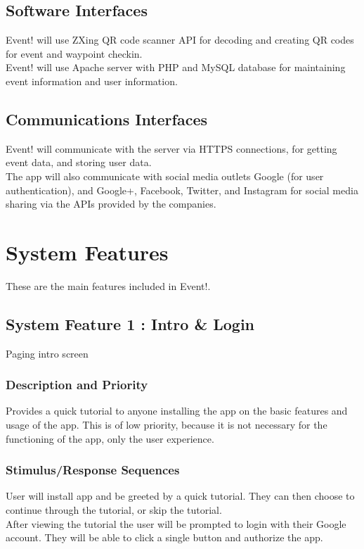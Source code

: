 \documentclass{scrreprt}
\begin{document}
\section{Software Interfaces}
Event! will use ZXing QR code scanner API for decoding and creating QR codes for 
event and waypoint checkin. \\
Event! will use Apache server with PHP and MySQL database for maintaining event 
information and user information.

\section{Communications Interfaces}
Event! will communicate with the server via HTTPS connections, for getting event 
data, and storing user data. \\
The app will also communicate with social media outlets Google (for user authentication), 
and Google+, Facebook, Twitter, and Instagram for social media sharing via the 
APIs provided by the companies.

\chapter{System Features}
These are the main features included in Event!.

\section{System Feature 1 : Intro \& Login}
Paging intro screen

\subsection{Description and Priority}
Provides a quick tutorial to anyone installing the app on the basic features and 
usage of the app. This is of low priority, because it is not necessary for the functioning 
of the app, only the user experience.

\subsection{Stimulus/Response Sequences}
User will install app and be greeted by a quick tutorial. They can then choose to 
continue through the tutorial, or skip the tutorial. \\
After viewing the tutorial the user will be prompted to login with their Google account.
They will be able to click a single button and authorize the app.
\end{document}

